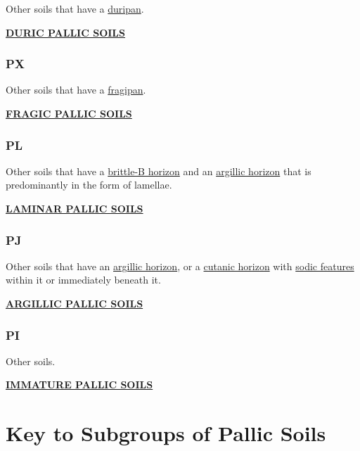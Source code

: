\documentclass[
  letterpaper,
  DIV=11,
  numbers=noendperiod]{scrreprt}
\begin{document}
Other soils that have a \protect\hyperlink{sec-diag-dpan}{duripan}.

\protect\hyperlink{sec-PU}{\textbf{DURIC PALLIC SOILS}}

\hypertarget{sec-key-PX}{%
\subsubsection{\texorpdfstring{\textbf{PX}}{PX}}\label{sec-key-PX}}

Other soils that have a \protect\hyperlink{sec-diag-fpan}{fragipan}.

\protect\hyperlink{sec-PX}{\textbf{FRAGIC PALLIC SOILS}}

\hypertarget{sec-key-PL}{%
\subsubsection{\texorpdfstring{\textbf{PL}}{PL}}\label{sec-key-PL}}

Other soils that have a \protect\hyperlink{sec-diag-britb}{brittle-B
horizon} and an \protect\hyperlink{sec-diag-argh}{argillic horizon} that
is predominantly in the form of lamellae.

\protect\hyperlink{sec-PL}{\textbf{LAMINAR PALLIC SOILS}}

\hypertarget{sec-key-PJ}{%
\subsubsection{\texorpdfstring{\textbf{PJ}}{PJ}}\label{sec-key-PJ}}

Other soils that have an \protect\hyperlink{sec-diag-argh}{argillic
horizon}, or a \protect\hyperlink{sec-diag-cuth}{cutanic horizon} with
\protect\hyperlink{sec-diag-sod}{sodic features} within it or
immediately beneath it.

\protect\hyperlink{sec-PJ}{\textbf{ARGILLIC PALLIC SOILS}}

\hypertarget{sec-key-PI}{%
\subsubsection{\texorpdfstring{\textbf{PI}}{PI}}\label{sec-key-PI}}

Other soils.

\protect\hyperlink{sec-PI}{\textbf{IMMATURE PALLIC SOILS}}

\hypertarget{sec-sub-P}{%
\section{Key to Subgroups of Pallic Soils}\label{sec-sub-P}}
\end{document}
